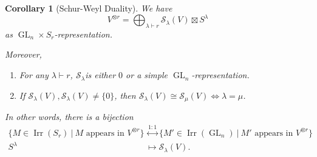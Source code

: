 \documentclass[10pt]{article}
\newtheorem{corollary}{Corollary} [section]
\numberwithin{equation}{theorem}
\DeclareMathOperator{\Irr}{Irr}
\DeclareMathOperator{\GL}{GL}
\newcommand{\sep}[0]{\:|\:}
\begin{document}
\begin{corollary}[Schur-Weyl Duality]
  We have 
  \begin{equation*}
    V^{\otimes r} = \bigoplus_{\lambda\vdash r}\mathcal{S}_\lambda(V)\boxtimes S^{\lambda}
  \end{equation*}
  as $\GL_n\times S_r$-representation.\\
  \par Moreover,
  \begin{enumerate}
  \item For any $\lambda\vdash r$, $\mathcal{S}_\lambda$is either $0$ or a simple $\GL_n$-representation. \\
  \item If $\mathcal{S}_\lambda(V),\mathcal{S}_\lambda(V)\not=\{0\}$, then $\mathcal{S}_\lambda(V) \cong \mathcal{S}_\mu(V)\Leftrightarrow \lambda= \mu$.
  \end{enumerate}
  In other words, there is a bijection 
  \begin{align*}
    \{M\in\Irr(S_r)\sep\text{$M$ appears in $V^{\otimes r}$}\}&\stackrel{1:1}{\leftrightarrow}\{M'\in\Irr(\GL_n)\sep \text{$M'$ appears in $V^{\otimes r}$}\}\\
    S^{\lambda}&\mapsto\mathcal{S}_{\lambda}(V).
  \end{align*}
\end{corollary}
\end{document}
